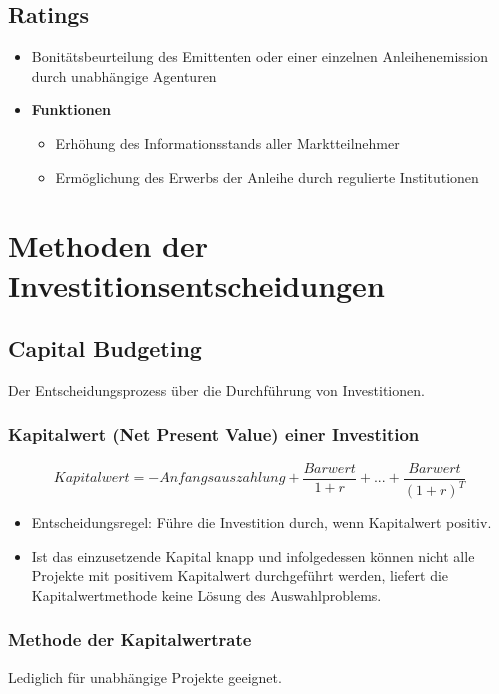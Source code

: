 \subsection{Ratings}
\begin{itemize}
	\item Bonitätsbeurteilung des Emittenten oder einer einzelnen Anleihenemission durch unabhängige Agenturen
	\item \textbf{Funktionen}
	\begin{itemize}
		\item Erhöhung des Informationsstands aller Marktteilnehmer
		\item Ermöglichung des Erwerbs der Anleihe durch regulierte Institutionen
	\end{itemize}
\end{itemize}



\section{Methoden der Investitionsentscheidungen}

\subsection{Capital Budgeting}
Der Entscheidungsprozess über die Durchführung von Investitionen.

\subsubsection{Kapitalwert (Net Present Value) einer Investition}

\[Kapitalwert = -Anfangsauszahlung + \frac{Barwert}{1+r}+...+\frac{Barwert}{(1+r)^T}\]

\begin{itemize}
	\item Entscheidungsregel: Führe die Investition durch, wenn Kapitalwert positiv.
	\item Ist das einzusetzende Kapital knapp und infolgedessen können nicht alle Projekte mit positivem Kapitalwert durchgeführt werden, liefert die Kapitalwertmethode keine Lösung des Auswahlproblems.
\end{itemize}

\subsubsection{Methode der Kapitalwertrate}
Lediglich für unabhängige Projekte geeignet.

